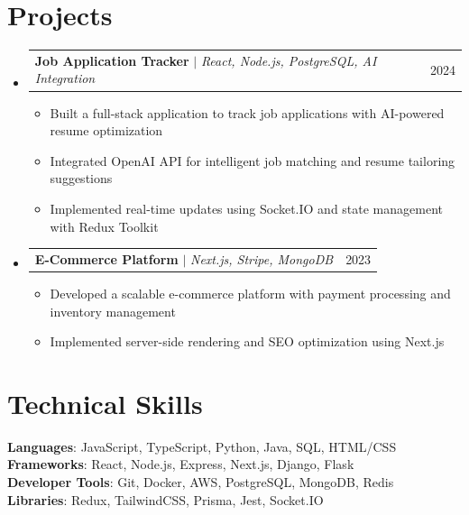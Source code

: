 \documentclass[letterpaper,11pt]{article}
\makeatletter
\newcommand{\resumeItem}[1]{
  \item\small{
    {#1 \vspace{-2pt}}
  }
}
\newcommand{\resumeProjectHeading}[2]{
    \vspace{-2pt}\item
    \begin{tabular*}{0.97\textwidth}{l@{\extracolsep{\fill}}r}
      \small#1 & #2 \\
    \end{tabular*}\vspace{-7pt}
}
\newcommand{\resumeSubHeadingListStart}{\begin{itemize}[leftmargin=0.15in, label={}]}
\newcommand{\resumeSubHeadingListEnd}{\end{itemize}}
\newcommand{\resumeItemListStart}{\begin{itemize}}
\newcommand{\resumeItemListEnd}{\end{itemize}\vspace{-5pt}}
\makeatother
\begin{document}
\section{Projects}
    \resumeSubHeadingListStart
      \resumeProjectHeading
          {\textbf{Job Application Tracker} $|$ \emph{React, Node.js, PostgreSQL, AI Integration}}{2024}
          \resumeItemListStart
            \resumeItem{Built a full-stack application to track job applications with AI-powered resume optimization}
            \resumeItem{Integrated OpenAI API for intelligent job matching and resume tailoring suggestions}
            \resumeItem{Implemented real-time updates using Socket.IO and state management with Redux Toolkit}
          \resumeItemListEnd
      \resumeProjectHeading
          {\textbf{E-Commerce Platform} $|$ \emph{Next.js, Stripe, MongoDB}}{2023}
          \resumeItemListStart
            \resumeItem{Developed a scalable e-commerce platform with payment processing and inventory management}
            \resumeItem{Implemented server-side rendering and SEO optimization using Next.js}
          \resumeItemListEnd
    \resumeSubHeadingListEnd

\section{Technical Skills}
 \begin{itemize}[leftmargin=0.15in, label={}]
    \small{\item{
     \textbf{Languages}{: JavaScript, TypeScript, Python, Java, SQL, HTML/CSS} \\
     \textbf{Frameworks}{: React, Node.js, Express, Next.js, Django, Flask} \\
     \textbf{Developer Tools}{: Git, Docker, AWS, PostgreSQL, MongoDB, Redis} \\
     \textbf{Libraries}{: Redux, TailwindCSS, Prisma, Jest, Socket.IO}
    }}
 \end{itemize}

\end{document}
